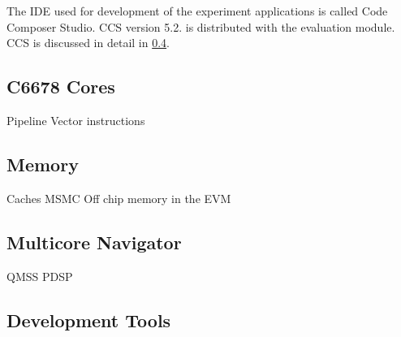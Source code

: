 The IDE used for development of the experiment applications is called Code
Composer Studio. CCS version 5.2. is distributed with the evaluation module.
CCS is discussed in detail in \ref{subsec:devtools}.
\subsection{C6678 Cores}
Pipeline
Vector instructions
\subsection{Memory}
\label{subsec:c66memory}
Caches
MSMC
Off chip memory in the EVM
\subsection{Multicore Navigator}
\label{subsec:multicorenav}
QMSS
PDSP
\subsection{Development Tools}
\label{subsec:devtools}

